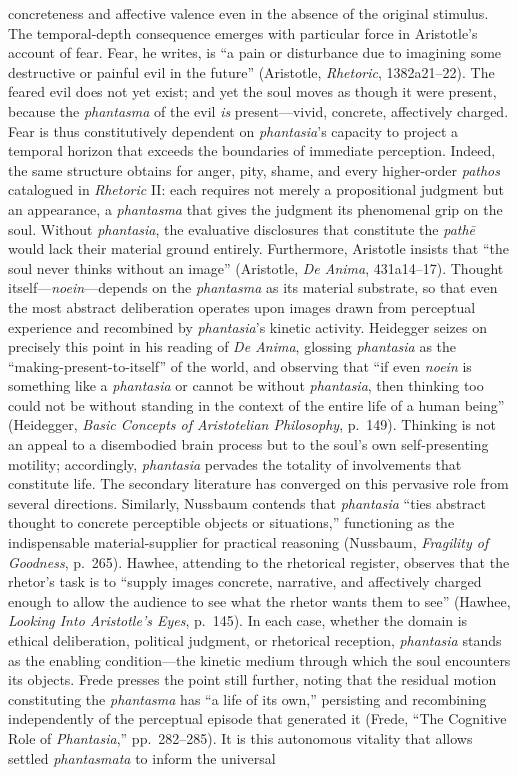 \documentclass{article}
\begin{document}
concreteness and affective valence even in the absence of the original stimulus. The temporal-depth consequence emerges with particular force in Aristotle's account of fear. Fear, he writes, is ``a pain or disturbance due to imagining some destructive or painful evil in the future'' (Aristotle, \textit{Rhetoric}, 1382a21--22). The feared evil does not yet exist; and yet the soul moves as though it were present, because the \textit{phantasma} of the evil \textit{is} present---vivid, concrete, affectively charged. Fear is thus constitutively dependent on \textit{phantasia}'s capacity to project a temporal horizon that exceeds the boundaries of immediate perception. Indeed, the same structure obtains for anger, pity, shame, and every higher-order \textit{pathos} catalogued in \textit{Rhetoric} II: each requires not merely a propositional judgment but an appearance, a \textit{phantasma} that gives the judgment its phenomenal grip on the soul. Without \textit{phantasia}, the evaluative disclosures that constitute the \textit{path\={e}} would lack their material ground entirely. Furthermore, Aristotle insists that ``the soul never thinks without an image'' (Aristotle, \textit{De Anima}, 431a14--17). Thought itself---\textit{noein}---depends on the \textit{phantasma} as its material substrate, so that even the most abstract deliberation operates upon images drawn from perceptual experience and recombined by \textit{phantasia}'s kinetic activity. Heidegger seizes on precisely this point in his reading of \textit{De Anima}, glossing \textit{phantasia} as the ``making-present-to-itself'' of the world, and observing that ``if even \textit{noein} is something like a \textit{phantasia} or cannot be without \textit{phantasia}, then thinking too could not be without standing in the context of the entire life of a human being'' (Heidegger, \textit{Basic Concepts of Aristotelian Philosophy}, p.~149). Thinking is not an appeal to a disembodied brain process but to the soul's own self-presenting motility; accordingly, \textit{phantasia} pervades the totality of involvements that constitute life. The secondary literature has converged on this pervasive role from several directions. Similarly, Nussbaum contends that \textit{phantasia} ``ties abstract thought to concrete perceptible objects or situations,'' functioning as the indispensable material-supplier for practical reasoning (Nussbaum, \textit{Fragility of Goodness}, p.~265). Hawhee, attending to the rhetorical register, observes that the rhetor's task is to ``supply images concrete, narrative, and affectively charged enough to allow the audience to see what the rhetor wants them to see'' (Hawhee, \textit{Looking Into Aristotle's Eyes}, p.~145). In each case, whether the domain is ethical deliberation, political judgment, or rhetorical reception, \textit{phantasia} stands as the enabling condition---the kinetic medium through which the soul encounters its objects. Frede presses the point still further, noting that the residual motion constituting the \textit{phantasma} has ``a life of its own,'' persisting and recombining independently of the perceptual episode that generated it (Frede, ``The Cognitive Role of \textit{Phantasia},'' pp.~282--285). It is this autonomous vitality that allows settled \textit{phantasmata} to inform the universal 
\end{document}
